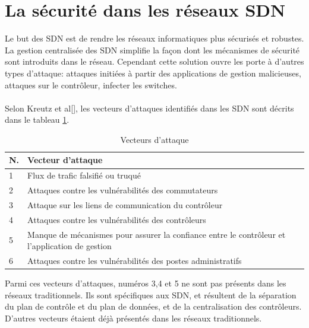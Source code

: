 \section{La sécurité dans les réseaux SDN}
Le but des SDN est de rendre les réseaux informatiques plus sécurisés et robustes. La gestion centralisée des SDN simplifie la façon dont les mécanismes de sécurité sont introduits dans le réseau. Cependant cette solution ouvre les porte à d'autres types d'attaque: attaques initiées à partir des applications de gestion malicieuses, attaques sur le contrôleur, infecter les switches.\\\\
Selon Kreutz et al[\cite{7}], les vecteurs d'attaques identifiés dans les SDN sont décrits dans le tableau \ref{table:Threat_Vectors}.
\newpage
\begin{table}[h]
\begin{center}
\begin{tabular}{  m{0.5cm} m{11cm} }
\hline
\textbf{N}. & \textbf{Vecteur d'attaque}\\
\hline
1 & Flux de trafic falsifié ou truqué\\
2 & Attaques contre les vulnérabilités des commutateurs\\
3 & Attaque sur les liens de communication du contrôleur\\
4 & Attaques contre les vulnérabilités des contrôleurs\\
5 & Manque de mécanismes pour assurer la confiance entre le contrôleur
et l'application de gestion\\
6 & Attaques contre les vulnérabilités des postes administratifs\\
\hline
\end{tabular}
\caption{Vecteurs d'attaque}
\label{table:Threat_Vectors}
\end{center}
\end{table}

Parmi ces vecteurs d'attaques, numéros 3,4 et 5 ne sont pas présents dans les réseaux traditionnels. Ils sont spécifiques aux SDN, et résultent de la séparation du plan de contrôle et du plan de données, et de la centralisation des contrôleurs. D'autres vecteurs étaient déjà présentés dans les réseaux traditionnels.

